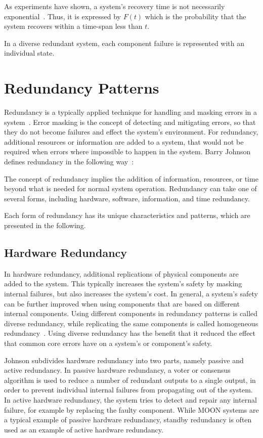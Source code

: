 As experiments have shown, a system's recovery time is not necessarily exponential~\cite{TheoryAndPracticeReliableSystem}.
Thus, it is expressed by $F(t)$ which is the probability that the system recovers within a time-span less than $t$.

In a diverse redundant system, each component failure is represented with an individual state.

\section{Redundancy Patterns}
\label{sec:redundancyPatterns}
Redundancy is a typically applied technique for handling and masking errors in a system~\cite{TanenbaumSteen07}.
Error masking is the concept of detecting and mitigating errors, so that they do not become failures and effect the system's environment.
For redundancy, additional resources or information are added to a system, that would not be required when errors where impossible to happen in the system.
Barry Johnson defines redundancy in the following way~\cite{BarryFaultToleranceAnalysis}:
\begin{definition}
The concept of redundancy implies the addition of information, resources, or time beyond what is needed for normal system operation.
Redundancy can take one of several forms, including hardware, software, information, and time redundancy.
\end{definition}

Each form of redundancy has its unique characteristics and patterns, which are presented in the following.

\subsection{Hardware Redundancy}
In hardware redundancy, additional replications of physical components are added to the system.
This typically increases the system's safety by masking internal failures, but also increases the system's cost.
In general, a system's safety can be further improved when using components that are based on different internal components.
Using different components in redundancy patterns is called diverse redundancy, while replicating the same components is called homogeneous redundancy~\cite{HomogeneousRedundancyOuzineb}.
Using diverse redundancy has the benefit that it reduced the effect that common core errors have on a system's or component's safety.

Johnson subdivides hardware redundancy into two parts, namely passive and active redundancy.
In passive hardware redundancy, a voter or consensus algorithm is used to reduce a number of redundant outputs to a single output, in order to prevent individual internal failures from propagating out of the system.
In active hardware redundancy, the system tries to detect and repair any internal failure, for example by replacing the faulty component.
While \gls*{MOON} systems are a typical example of passive hardware redundancy, standby redundancy is often used as an example of active hardware redundancy.

